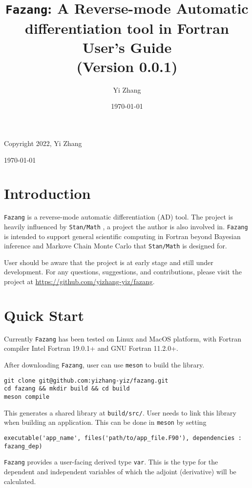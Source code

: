 \documentclass[12pt, reqno, oneside]{amsbook}
\author{Yi Zhang}
\date{\today}
\title{\texttt{Fazang}: A Reverse-mode Automatic differentiation tool in Fortran\\\medskip
\large User's Guide \\  (Version 0.0.1)}
\begin{document}
\begin{titlepage}
\maketitle
Copyright 2022, Yi Zhang
\newline
\newline
\newline

\today
\tableofcontents
\end{titlepage}

\chapter{Introduction}
\label{sec:orge5cce52}
\texttt{Fazang} is a reverse-mode automatic differentiation (AD) tool. The
project is heavily influenced by \texttt{Stan/Math} \cite{Carpenter:2015}, a project the author
is also involved in. \texttt{Fazang} is intended to support general scientific
computing in Fortran beyond Bayesian inference and Markove Chain
Monte Carlo that \texttt{Stan/Math} is designed for. 

User should be aware that the project is at early stage and still
under development. For any questions, suggestions, and
contributions, please visit the project at \url{https://github.com/yizhang-yiz/fazang}.
\chapter{Quick Start}
\label{sec:org4821d13}
Currently \texttt{Fazang} has been tested on Linux and MacOS platform, with
Fortran compiler Intel Fortran 19.0.1+ and GNU Fortran 11.2.0+.

After downloading \texttt{Fazang}, user can use \texttt{meson} to build the library.
\begin{verbatim}
git clone git@github.com:yizhang-yiz/fazang.git
cd fazang && mkdir build && cd build
meson compile
\end{verbatim}
This generates a shared library at \texttt{build/src/}. User needs to link
this library when building an application. This can be done in
\texttt{meson} by setting
\begin{verbatim}
executable('app_name', files('path/to/app_file.F90'), dependencies : fazang_dep)
\end{verbatim}

\texttt{Fazang} provides a user-facing derived type \texttt{var}. This is the
type for the dependent and independent variables of which the
adjoint (derivative) will be calculated.
\end{document}
